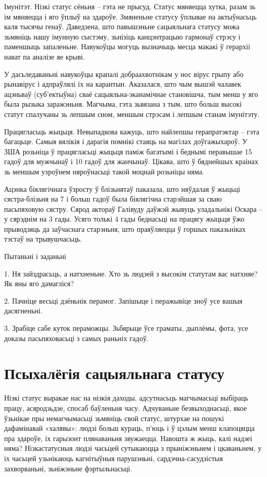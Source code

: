 Імунітэт. Нізкі статус сёньня – гэта не прысуд. Статус мяняецца хутка, разам зь ім мяняецца і яго ўплыў на здароўе. Змяненьне статусу ўплывае на актыўнасьць каля тысячы генаў. Даведзена, што павышэньне сацыяльнага статусу можа зьмяніць нашу імунную сыстэму, зьнізіць канцэнтрацыю гармонаў стрэсу і паменшыць запаленьне. Навукоўцы могуць вызначыць месца макакі ў герархіі нават па аналізе яе крыві.

У дасьледаваньні навукоўцы крапалі добраахвотнікам у нос вірус грыпу або рынавірус і адпраўлялі іх на карантын. Аказалася, што чым вышэй чалавек ацэньваў (суб'ектыўна) сваё сацыяльна-эканамічнае становішча, тым менш у яго была рызыка заражэньня. Магчыма, гэта зьвязана з тым, што больш высокі статут спалучаны зь лепшым сном, меншым стрэсам і лепшым станам імунітэту.

Працягласьць жыцьця. Невыпадкова кажуць, што найлепшы герапратэктар – гэта багацьце. Самыя вялікія і дарагія помнікі стаяць на магілах доўгажыхароў. У ЗША розьніца ў працягласьці жыцьця паміж багатымі і беднымі перавышае 15 гадоў для мужчынаў і 10 гадоў для жанчынаў. Цікава, што ў бяднейшых краінах зь меншым узроўнем няроўнасьці такой моцнай розьніцы няма.

Ацэнка біялягічнага ўзросту ў блізьнятаў паказала, што няўдалая ў жыцьці сястра-блізьня на 7 і больш гадоў была біялягічна старэйшая за сваю пасьпяховую сястру. Сярод актораў Галівуду даўжэй жывуць уладальнікі Оскара – у сярэднім на 3 гады. Усяго толькі 4 гады беднасьці на працягу жыцьця ўжо прыводзяць да заўчаснага старэньня, што праяўляецца ў горшых паказьніках тэстаў на трывушчасьць.

Пытаньні і заданьні

1. Ня зайздрасьць, а натхненьне. Хто зь людзей з высокім статутам вас натхняе? Як яны яго дамагліся?

2. Пачніце весьці дзёньнік перамог. Запішыце і перажывіце зноў усе вашыя дасягненьні.

3. Зрабіце сабе куток пераможцы. Зьбярыце ўсе граматы, дыплёмы, фота, усе доказы пасьпяховасьці з самых раньніх гадоў.


\section{Псыхалёгія сацыяльнага статусу}

Нізкі статус выракае нас на нізкія даходы, адсутнасьць магчымасьці выбіраць працу, асяродзьдзе, спосаб баўленьня часу. Адчуваньне безвыходнасьці, якое ўзьнікае пры немагчымасьці зьмяніць свой статус, штурхае на пошукі дафамінавай «халявы»: людзі больш кураць, п'юць і ў цэлым менш клапоцяцца пра здароўе, іх гарызонт плянаваньня звужаецца. Навошта ж жыць, калі надзеі няма? Нізкастатусныя людзі часьцей сутыкаюцца з прыніжэньнем і цкаваньнем, у іх часьцей узьнікаюць кагнітыўныя парушэньні, сардэчна-сасудзістыя захворваньні, зьніжэньне фэртыльнасьці.


